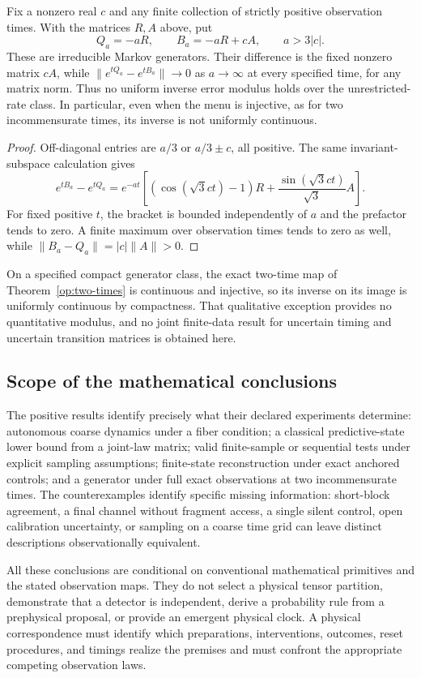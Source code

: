 \begin{theorem}
\label{op:rate-instability}
Fix a nonzero real \(c\) and any finite collection of strictly positive
observation times.  With the matrices \(R,A\) above, put
\[
 Q_a=-aR,\qquad B_a=-aR+cA,\qquad a>3|c|.
\]
These are irreducible Markov generators.  Their difference is the fixed
nonzero matrix \(cA\), while
\(\|e^{tQ_a}-e^{tB_a}\|\to0\) as \(a\to\infty\) at every specified
time, for any matrix norm.
Thus no uniform inverse error modulus holds over the unrestricted-rate
class.  In particular, even when the menu is injective, as for two
incommensurate times, its inverse is not uniformly continuous.
\end{theorem}
\begin{proof}
Off-diagonal entries are \(a/3\) or \(a/3\pm c\), all positive.
The same invariant-subspace calculation gives
\[
 e^{tB_a}-e^{tQ_a}
 =e^{-at}\left[
   (\cos(\sqrt3ct)-1)R+
   \frac{\sin(\sqrt3ct)}{\sqrt3}A\right].
\]
For fixed positive \(t\), the bracket is bounded independently of \(a\)
and the prefactor tends to zero.  A finite maximum over observation
times tends to zero as well, while
\(\|B_a-Q_a\|=|c|\|A\|>0\).
\end{proof}

On a specified compact generator class, the exact two-time map of
Theorem~\ref{op:two-times} is continuous and injective, so its inverse
on its image is uniformly continuous by compactness.
That qualitative exception provides no quantitative modulus, and no
joint finite-data result for uncertain timing and uncertain transition
matrices is obtained here.

\subsection{Scope of the mathematical conclusions}
\label{op:scope}

The positive results identify precisely what their declared experiments
determine: autonomous coarse dynamics under a fiber condition; a
classical predictive-state lower bound from a joint-law matrix; valid
finite-sample or sequential tests under explicit sampling assumptions;
finite-state reconstruction under exact anchored controls; and a
generator under full exact observations at two incommensurate times.
The counterexamples identify specific missing information: short-block
agreement, a final channel without fragment access, a single silent
control, open calibration uncertainty, or sampling on a coarse time
grid can leave distinct descriptions observationally equivalent.

All these conclusions are conditional on conventional mathematical
primitives and the stated observation maps.  They do not select a
physical tensor partition, demonstrate that a detector is independent,
derive a probability rule from a prephysical proposal, or provide an
emergent physical clock.  A physical correspondence must identify which
preparations, interventions, outcomes, reset procedures, and timings
realize the premises and must confront the appropriate competing
observation laws.
